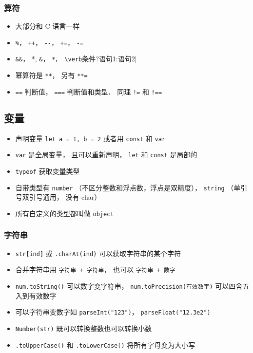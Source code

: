 \subsubsection{算符}
\begin{itemize}
\item 大部分和 C 语言一样
\item \verb|%|， \verb|++|， \verb|--|， \verb|+=|， \verb|-=|
\item \verb|&&|， \verb*||*, \verb|&|， \verb*|*， \verb|条件?语句1:语句2|
\item 幂算符是 \verb|**|， 另有 \verb|**=|
\item \verb|==| 判断值， \verb|===| 判断值和类型． 同理 \verb|!=| 和 \verb|!==|
\end{itemize}

\subsection{变量}
\begin{itemize}
\item 声明变量 \verb|let a = 1, b = 2| 或者用 \verb|const| 和 \verb|var|
\item \verb|var| 是全局变量， 且可以重新声明， \verb|let| 和 \verb|const| 是局部的
\item \verb|typeof| 获取变量类型
\item 自带类型有 \verb|number| （不区分整数和浮点数，浮点是双精度）， \verb|string| （单引号双引号通用， 没有 char）
\item 所有自定义的类型都叫做 \verb|object|
\end{itemize}

\subsubsection{字符串}
\begin{itemize}
\item \verb|str[ind]| 或 \verb|.charAt(ind)| 可以获取字符串的某个字符
\item 合并字符串用 \verb|字符串 + 字符串|， 也可以 \verb|字符串 + 数字|
\item \verb|num.toString()| 可以数字变字符串， \verb|num.toPrecision(有效数字)| 可以四舍五入到有效数字
\item 可以字符串变数字如 \verb|parseInt("123")|， \verb|parseFloat("12.3e2")|
\item \verb|Number(str)| 既可以转换整数也可以转换小数
\item \verb|.toUpperCase()| 和 \verb|.toLowerCase()| 将所有字母变为大小写
\end{itemize}


